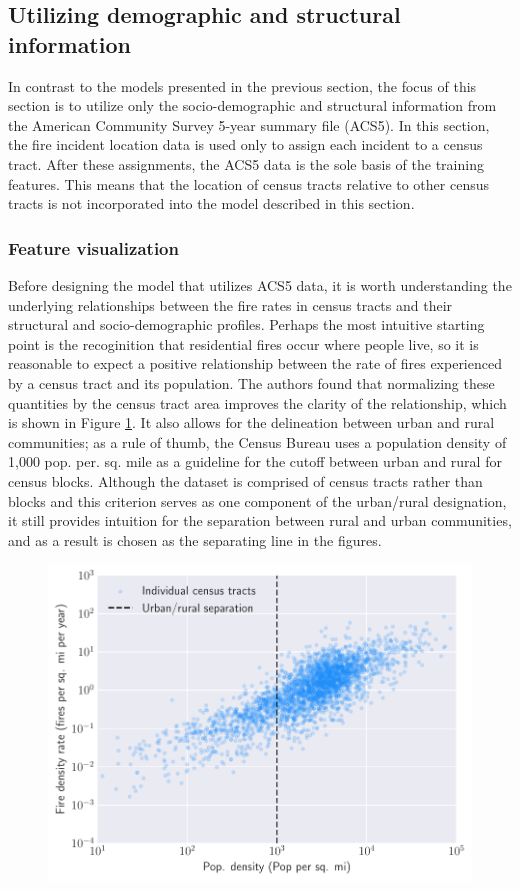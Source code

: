 \documentclass{svjour3}
\begin{document}
  
  

  \subsection{Utilizing demographic and structural information}
  In contrast to the models presented in the previous section, the focus of this section is to utilize only the socio-demographic and structural information from the American Community Survey 5-year summary file (ACS5). In this section, the fire incident location data is used only to assign each incident to a census tract. After these assignments, the ACS5 data is the sole basis of the training features. This means that the location of census tracts relative to other census tracts is not incorporated into the model described in this section.

  \subsubsection{Feature visualization}
  Before designing the model that utilizes ACS5 data, it is worth understanding the underlying relationships between the fire rates in census tracts and their structural and socio-demographic profiles. Perhaps the most intuitive starting point is the recoginition that residential fires occur where people live, so it is reasonable to expect a positive relationship between the rate of fires experienced by a census tract and its population. The authors found that normalizing these quantities by the census tract area improves the clarity of the relationship, which is shown in Figure \ref{fig:pop_relation}. It also allows for the delineation between urban and rural communities; as a rule of thumb, the Census Bureau   \cite{ratcliffe2016defining} uses a population density of 1,000 pop. per. sq. mile as a guideline for the cutoff between urban and rural for census blocks. Although the dataset is comprised of census tracts rather than blocks and this criterion serves as one component of the urban/rural designation, it still provides intuition for the separation between rural and urban communities, and as a result is chosen as the separating line in the figures. 
  
  
  
 \begin{figure}[htb] \centering
\includegraphics[width=.75\textwidth]{figures/pop_relation.pdf}
\caption{}
\label{fig:pop_relation}
\end{figure}
  
\end{document}
